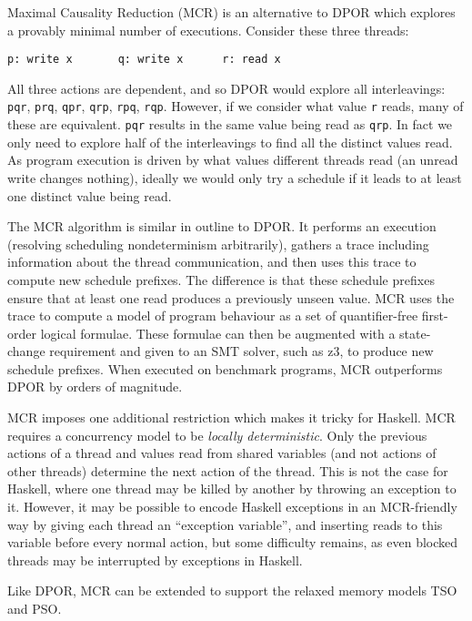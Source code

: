 Maximal Causality Reduction (MCR)\cite{huang2015,huang2017} is an alternative to
DPOR which explores a provably minimal number of executions.  Consider these
three threads:

\begin{center}
\verb|p: write x       q: write x      r: read x|
\end{center}

All three actions are dependent, and so DPOR would explore all interleavings:
\texttt{pqr}, \texttt{prq}, \texttt{qpr}, \texttt{qrp}, \texttt{rpq}, \texttt{rqp}.
However, if we consider what value \texttt{r} reads, many of these are
equivalent.  \texttt{pqr} results in the same value being read as \texttt{qrp}.
In fact we only need to explore half of the interleavings to find all the
distinct values read.  As program execution is driven by what values different
threads read (an unread write changes nothing), ideally we would only try a
schedule if it leads to at least one distinct value being read.

The MCR algorithm is similar in outline to DPOR\@.  It performs an execution
(resolving scheduling nondeterminism arbitrarily), gathers a trace including
information about the thread communication, and then uses this trace to compute
new schedule prefixes.  The difference is that these schedule prefixes ensure
that at least one read produces a previously unseen value.  MCR uses the trace
to compute a model of program behaviour as a set of quantifier-free first-order
logical formulae.  These formulae can then be augmented with a state-change
requirement and given to an SMT solver, such as z3, to produce new schedule
prefixes.  When executed on benchmark programs, MCR outperforms DPOR by orders
of magnitude\cite{huang2017}.

MCR imposes one additional restriction which makes it tricky for
Haskell.  MCR requires a concurrency model to be \emph{locally
  deterministic}\cite{huang2015}.  Only the previous actions of a
thread and values read from shared variables (and not actions of other
threads) determine the next action of the thread.  This is not the
case for Haskell, where one thread may be killed by another by
throwing an exception to it.  However, it may be possible to encode
Haskell exceptions in an MCR-friendly way by giving each thread an
``exception variable'', and inserting reads to this variable before
every normal action, but some difficulty remains, as even blocked
threads may be interrupted by exceptions in Haskell.

Like DPOR, MCR can be extended to support the relaxed memory models TSO and
PSO\cite{huang2016}.

